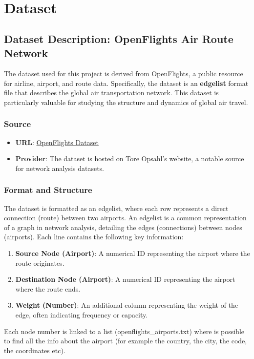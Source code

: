 \documentclass[12pt]{article}
\begin{document}
\section{Dataset}

\subsection{Dataset Description: OpenFlights Air Route Network}
The dataset used for this project is derived from OpenFlights, a public resource for airline, airport, and route data. Specifically, the dataset is an \textbf{edgelist} format file that describes the global air transportation network. This dataset is particularly valuable for studying the structure and dynamics of global air travel.

\subsubsection{Source}
\begin{itemize}
    \item \textbf{URL}: \href{http://opsahl.co.uk/tnet/datasets/openflights.txt}{OpenFlights Dataset}
    \item \textbf{Provider}: The dataset is hosted on Tore Opsahl’s website, a notable source for network analysis datasets.
\end{itemize}

\subsubsection{Format and Structure}
The dataset is formatted as an edgelist, where each row represents a direct connection (route) between two airports. An edgelist is a common representation of a graph in network analysis, detailing the edges (connections) between nodes (airports). Each line contains the following key information:
\begin{enumerate}
    \item \textbf{Source Node (Airport)}: A numerical ID representing the airport where the route originates.
    \item \textbf{Destination Node (Airport)}: A numerical ID representing the airport where the route ends.
    \item \textbf{Weight (Number)}: An additional column representing the weight of the edge, often indicating frequency or capacity.
\end{enumerate}
Each node number is linked to a list (openflights\_airports.txt) where is possible to find all the info about the airport (for example the country, the city, the code, the coordinates etc).
\end{document}
